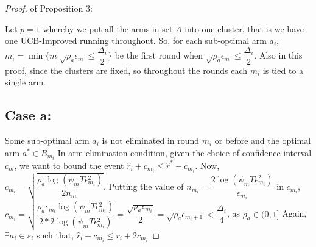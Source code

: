 \begin{proof} of Proposition 3:

Let $p=1$ whereby we put all the arms in set $A$ into one cluster, that is we have one UCB-Improved running throughout. So, for each sub-optimal arm $a_{i}$, $m_{i}=\min{\lbrace m|\sqrt{\rho_{a}\epsilon_{m}}\leq \dfrac{\Delta_{i}}{2} \rbrace}$ be the first round when $\sqrt{\rho_{a}\epsilon_{m}}\leq \dfrac{\Delta_{i}}{2}$. Also in this proof, since the clusters are fixed, so throughout the rounds each $m_{i}$ is tied to a single arm.

\subsection{Case a:} 
Some sub-optimal arm $a_{i}$ is not eliminated in round $m_{i}$ or before and the optimal arm $a^{*}\in B_{m_{i}}$
\newline In arm elimination condition, given the choice of confidence interval $c_{m}$, we want to bound the event $\hat{r}_{i}+c_{m_{i}}\leq \hat{r}^{*}-c_{m_{i}}$. 
\newline Now, $c_{m_{i}}=\sqrt{\dfrac{\rho_{a}\log (\psi_{m}T\epsilon_{m_{i}}^{2})}{2 n_{m_{i}}}}$.
\newline Putting the value of $n_{m_{i}}=\dfrac{2\log{(\psi_{m}T\epsilon_{m_{i}}^{2})}}{\epsilon_{m_{i}}}$ in $c_{m_{i}}$,
\newline $c_{m_{i}}=\sqrt{\dfrac{\rho_{a}\epsilon_{m_{i}}\log (\psi_{m}T\epsilon_{m_{i}}^{2})}{2*2 \log(\psi_{m}T\epsilon_{m_{i}}^{2})}}=\dfrac{\sqrt{\rho_{a}\epsilon_{m_{i}}}}{2} = \sqrt{\rho_{a}\epsilon_{m_{i}+1}} < \dfrac{\Delta_{i}}{4} $, as $\rho_{a}\in (0,1]$
\newline Again, $\exists a_{i} \in s_{i}$ such that, 
$\hat{r}_{i} + c_{m_{i}}\leq r_{i} + 2c_{m_{i}} $

\end{proof}
